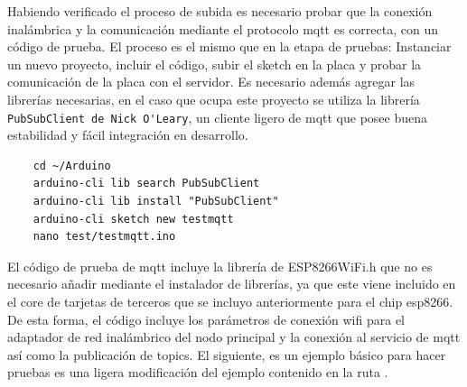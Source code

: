 \vspace{0.5cm}


Habiendo verificado el proceso de subida es necesario probar que la conexión inalámbrica y la comunicación mediante el protocolo \gls{mqtt} es correcta, con un código de prueba. El proceso es el mismo que en la etapa de pruebas: Instanciar un nuevo proyecto, incluir el código, subir el \gls{sketch} en la placa y probar la comunicación de la placa con el servidor. Es necesario además agregar las librerías necesarias, en el caso que ocupa este proyecto se utiliza la librería \verb|PubSubClient de Nick O'Leary|, un cliente ligero de \gls{mqtt} que posee buena estabilidad y fácil integración en desarrollo.

\begin{verbatim}
    cd ~/Arduino
    arduino-cli lib search PubSubClient
    arduino-cli lib install "PubSubClient"
    arduino-cli sketch new testmqtt
    nano test/testmqtt.ino
\end{verbatim}

El código de prueba de \gls{mqtt} incluye la librería de ESP8266WiFi.h que no es necesario añadir mediante el instalador de librerías, ya que este viene incluido en el core de tarjetas de terceros que se incluyo anteriormente para el chip esp8266. De esta forma, el código incluye los parámetros de conexión \gls{wifi} para el adaptador de red inalámbrico del nodo principal y la conexión al servicio de \gls{mqtt} así como la publicación de topics. El siguiente, es un ejemplo básico para hacer pruebas es una ligera modificación del ejemplo contenido en la ruta .


